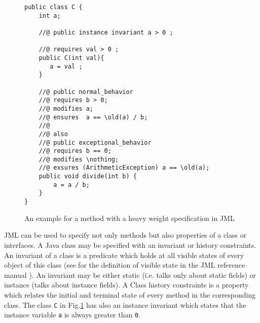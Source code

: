    
\begin{figure}
\begin{lstlisting}[frame=trbl]
public class C {
    int a;
    
    //@ public instance invariant a > 0 ;
    
    //@ requires val > 0 ;
    public C(int val){
       a = val ;
    }
   
    //@ public normal_behavior
    //@ requires b > 0;
    //@ modifies a;
    //@ ensures  a == \old(a) / b;  
    //@
    //@ also 
    //@ public exceptional_behavior
    //@ requires b == 0;
    //@ modifies \nothing;
    //@ exsures (ArithmeticException) a == \old(a);
    public void divide(int b) {
        a = a / b;
    }
}
\end{lstlisting}
\caption{\sc An example for a method with a heavy weight specification in JML} \label{bml:heavySp}
\end{figure}

JML can be used to specify not only methods but also properties of a class or interfaces. 
A Java class may be specified with an invariant or history constraints. An invariant of a class is a predicate which holds at all visible states of
  every object of this class (see for the definition of visible state in the JML reference manual \cite{december-jml}). An invariant may be either static 
 (i.e. talks only about static fields) or instance (talks about instance fields).
  A Class history constraints is a property which relates the initial and terminal state of every method in the corresponding class. 
 The class \texttt{C}  in Fig.\ref{bml:heavySp} has also an instance invariant which states that the instance variable \texttt{a} is
 always greater than \texttt{0}.


